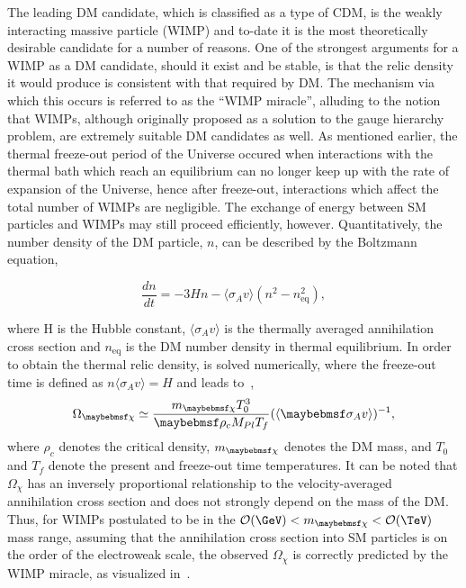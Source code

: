 The leading DM candidate, which is classified as a type of CDM, is the weakly interacting massive particle (WIMP) and to-date it is the most theoretically desirable candidate for a number of reasons. One of the strongest arguments for a WIMP as a DM candidate, should it exist and be stable, is that the relic density it would produce is consistent with that required by DM. The mechanism via which this occurs is referred to as the ``WIMP miracle'', alluding to the notion that WIMPs, although originally proposed as a solution to the gauge hierarchy problem, are extremely suitable DM candidates as well. As mentioned earlier, the thermal freeze-out period of the Universe occured when interactions with the thermal bath which reach an equilibrium can no longer keep up with the rate of expansion of the Universe, hence after freeze-out, interactions which affect the total number of WIMPs are negligible. The exchange of energy between SM particles and WIMPs may still proceed efficiently, however. Quantitatively, the number density of the DM particle, $n$, can be described by the Boltzmann equation,

\begin{equation}
  \frac{dn}{dt} = -3Hn - \langle\sigma_A v \rangle(n^2 - n_{\mathrm{eq}}^2),
  \label{eq:boltz}
\end{equation}

where H is the Hubble constant, $\langle\sigma_A v\rangle$ is the thermally averaged annihilation cross section and $n_{\mathrm{eq}}$ is the DM number density in thermal equilibrium. In order to obtain the thermal relic density,  is solved numerically, where the freeze-out time is defined as $n\langle\sigma_{A} v\rangle = H$ and leads to~\cite{PhysRevD.33.1585},
\begin{equation}
  \Omega_{\chi} \simeq \frac{\mDM T_0^3}{\rho_c M_{Pl} T_f} (\langle \sigma_A v \rangle)^{-1},
\label{eq:Omega}
\end{equation}
where $\rho_c$ denotes the critical density, $\mDM$ denotes the DM mass, and $T_0$ and $T_f$ denote the present and freeze-out time temperatures. It can be noted that $\Omega_{\chi}$ has an inversely proportional relationship to the velocity-averaged annihilation cross section and does not strongly depend on the mass of the DM. Thus, for WIMPs postulated to be in the $\mathcal{O}(\GeV) < \mDM < \mathcal{O}(\TeV)$ mass range, assuming that the annihilation cross section into SM particles is on the order of the electroweak scale, the observed $\Omega_{\chi}$ is correctly predicted by the WIMP miracle, as visualized in~.

